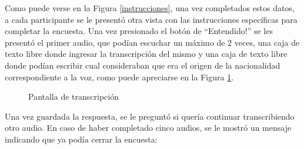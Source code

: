 Como puede verse en la Figura \ref{instrucciones}, una vez completados estos datos, a cada participante se le presentó otra vista con las instrucciones específicas para completar la encuesta. Una vez presionado el botón de ``Entendido!'' se les presentó el primer audio, que podían escuchar un máximo de $2$ veces, una caja de texto libre donde ingresar la transcripción del mismo y una caja de texto libre donde podían escribir cual consideraban que era el origen de la nacionalidad correspondiente a la voz, como puede apreciarse en la Figura \ref{transcripcion}.

\begin{figure}
\begin{center}
\end{center}
\caption{Pantalla de transcripción}
\label{transcripcion}
\end{figure}

Una vez guardada la respuesta, se le preguntó si quería continuar transcribiendo otro audio. En caso de haber completado cinco audios, se le mostró un mensaje indicando que ya podía cerrar la encuesta:

\begin{center}
\end{center}
